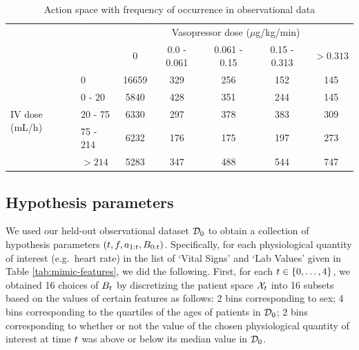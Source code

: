 \begin{table}[t]%
    \centering
    \begin{footnotesize}
\begin{tabular}{ll|ccccc}
\multicolumn{1}{c}{} & \multicolumn{1}{c}{} & \multicolumn{5}{c}{Vasopressor dose ($\mu$g/kg/min)}\\
\multicolumn{1}{c}{} & \multicolumn{1}{c}{} &      0 &  0.0 - 0.061 &  0.061 - 0.15 &  0.15 - 0.313 &  $>0.313$ \\
\midrule
\multirow{5}{*}{IV dose (mL/h)} & 0        &  16659 &          329 &           256 &           152 &      145 \\
& 0 - 20   &   5840 &          428 &           351 &           244 &      145 \\
& 20 - 75  &   6330 &          297 &           378 &           383 &      309 \\
& 75 - 214 &   6232 &          176 &           175 &           197 &      273 \\
& $>214$    &   5283 &          347 &           488 &           544 &      747 \\
\end{tabular}
    \end{footnotesize}
\caption{Action space with frequency of occurrence in observational data} \label{tab:act_space}
\end{table}

\subsection{Hypothesis parameters} \label{sec:hypothesis-parameters-supplement}

We used our held-out observational dataset $\mathcal{D}_0$ to obtain a collection of hypothesis parameters $(t, f, a_{1:t}, B_{0:t})$.
Specifically, for each physiological quantity of interest (e.g.\ heart rate) in the list of `Vital Signs' and `Lab Values' given in Table \ref{tab:mimic-features}, we did the following.
First, for each $t \in \{0, \ldots, 4\}$, we obtained 16 choices of $B_{t}$ by discretizing the patient space $\mathcal{X}_{t}$ into 16 subsets based on the values of certain features as follows: 2 bins corresponding to sex; 4 bins corresponding to the quartiles of the ages of patients in $\mathcal{D}_0$; 2 bins corresponding to whether or not the value of the chosen physiological quantity of interest at time $t$ was above or below its median value in $\mathcal{D}_0$.

